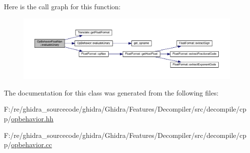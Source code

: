 Here is the call graph for this function\+:
\nopagebreak
\begin{figure}[H]
\begin{center}
\leavevmode
\includegraphics[width=350pt]{class_op_behavior_float_nan_a7863907c32548fd08e6207c9ea945057_cgraph}
\end{center}
\end{figure}


The documentation for this class was generated from the following files\+:\begin{DoxyCompactItemize}
\item 
F\+:/re/ghidra\+\_\+sourcecode/ghidra/\+Ghidra/\+Features/\+Decompiler/src/decompile/cpp/\mbox{\hyperlink{opbehavior_8hh}{opbehavior.\+hh}}\item 
F\+:/re/ghidra\+\_\+sourcecode/ghidra/\+Ghidra/\+Features/\+Decompiler/src/decompile/cpp/\mbox{\hyperlink{opbehavior_8cc}{opbehavior.\+cc}}\end{DoxyCompactItemize}
